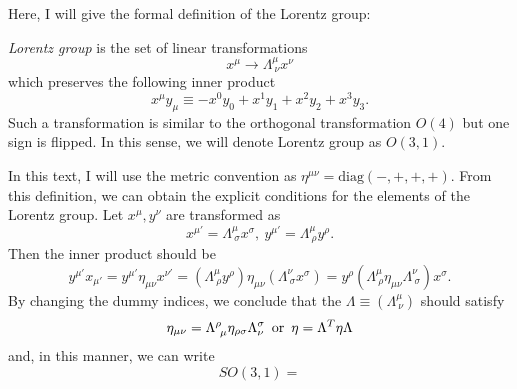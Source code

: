 \documentclass[a4paper,pdftex,10pt]{report}
\begin{document}
Here, I will give the formal definition of the Lorentz group:
\begin{graybox}
  \textit{Lorentz group} is the set of linear transformations
  \begin{equation}
    x^{\mu}
    \rightarrow
    \Lambda^{\mu}_{\ \nu}x^{\nu}
  \end{equation}
  which preserves the following inner product  
  \begin{equation}
    x^{\mu}y_{\mu}
    \equiv
    -x^{0}y_{0}
    +x^{1}y_{1}
    +x^{2}y_{2}
    +x^{3}y_{3}
    .
  \end{equation}
  Such a transformation is similar to the orthogonal transformation $O(4)$ but one sign is flipped. In this sense, we will denote Lorentz group as $O(3,1)$. 
\end{graybox}
In this text, I will use the metric convention as $\eta^{\mu\nu}=\textrm{diag}(-,+,+,+)$. From this definition, we can obtain the explicit conditions for the elements of the Lorentz group. Let $x^{\mu}, y^{\nu}$ are transformed as 
\begin{equation}
  x^{\mu\prime}
  =
  \Lambda^{\mu}_{\ \sigma}x^{\sigma}
  ,\ 
  y^{\mu\prime}
  =
  \Lambda^{\mu}_{\ \rho}y^{\rho}
  .
\end{equation}
Then the inner product should be
\begin{equation}
  y^{\mu\prime}x_{\mu\prime}
  =
  y^{\mu\prime}\eta_{\mu\nu}x^{\nu\prime}
  =
  (\Lambda^{\mu}_{\ \rho}y^{\rho})\eta_{\mu\nu}(\Lambda^{\nu}_{\ \sigma}x^{\sigma})
  =
  y^{\rho}(\Lambda^{\mu}_{\ \rho}\eta_{\mu\nu}\Lambda^{\nu}_{\ \sigma})x^{\sigma}
  .
\end{equation}
By changing the dummy indices, we conclude that the $\Lambda\equiv(\Lambda^{\mu}_{\ \nu})$ should satisfy 
\begin{equation}
  \eta_{\mu\nu}
  =
  \Lambda^{\rho}_{\ \mu}\eta_{\rho\sigma}\Lambda^{\sigma}_{ \nu}
  \hspace*{5pt}\textrm{or}\hspace*{5pt}
  \eta
  =
  \Lambda^{T}\eta\Lambda
\end{equation} 
and, in this manner, we can write 
\begin{equation}
  SO(3,1)
  =
\end{equation}
\end{document}

